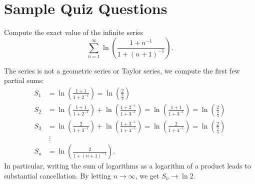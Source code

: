 \documentclass{ximera}
\begin{document}
\section*{Sample Quiz Questions}

\begin{question}%

Compute the exact value of the infinite series
\[ \sum_{n=1}^\infty \ln \left( \frac{1 + n^{-1}}{1 + (n+1)^{-1}} \right). \]
\begin{multiplechoice}
\end{multiplechoice}
\begin{feedback}
The series is not a geometric series or Taylor series, we compute the first few partial sums:
\[ 
\begin{aligned}
S_1 & = \ln \left( \frac{1 + 1}{1 + 2^{-1}} \right)  = \ln \left( \frac{2}{\frac{3}{2}} \right) \\
S_2 & = \ln \left( \frac{1 + 1}{1 + 2^{-1}} \right)  + \ln \left( \frac{1 + 2^{-1}}{1 + 3^{-1}} \right)  = \ln \left( \frac{1 + 1}{1 + 3^{-1}} \right) = \ln \left( \frac{2}{\frac{4}{3}} \right) \\
S_3 & = \ln \left( \frac{2}{1 + 3^{-1}} \right)  + \ln \left( \frac{1 + 3^{-1}}{1 + 4^{-1}} \right)  = \ln \left( \frac{2}{1 + 4^{-1}} \right) = \ln \left( \frac{2}{\frac{5}{4}} \right) \\
& \ \vdots  \\
S_n & = \ln \left( \frac{2}{1 + (n+1)^{-1}} \right).
 \end{aligned}
\]
In particular, writing the sum of logarithms as a logarithm of a product leads to substantial cancellation.  By letting \(n \rightarrow \infty\), we get \(S_n \rightarrow \ln 2\).
\end{feedback}

\end{question}
\end{document}
